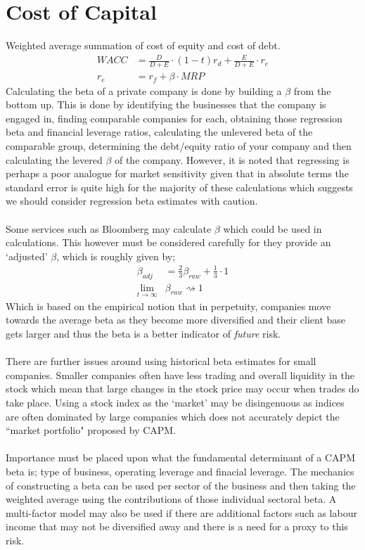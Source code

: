 \documentclass[a4paper]{article}
\begin{document}
\section{Cost of Capital}
Weighted average summation of cost of equity and cost of debt.
\begin{align*}
WACC &= \frac{D}{D+E} \cdot (1-t)r_d + \frac{E}{D + E} \cdot r_e \\
r_e &= r_f + \beta \cdot MRP
\end{align*}
Calculating the beta of a private company is done by building a $\beta$ from the
bottom up. This is done by identifying the businesses that the company is
engaged in, finding comparable companies for each, obtaining those regression
beta and financial leverage ratios, calculating the unlevered beta of the
comparable group, determining the debt/equity ratio of your company and then
calculating the levered $\beta$ of the company. However, it is noted that
regressing is perhaps a poor analogue for market sensitivity given that in
absolute terms the standard error is quite high for the majority of these
calculations which suggests we should consider regression beta estimates with
caution.\\\\
%
%
Some services such as Bloomberg may calculate $\beta$ which could be used in
calculations. This however must be considered carefully for they provide
an `adjusted' $\beta$, which is roughly given by;
\begin{align*}
\beta_{adj} &= \frac{2}{3} \beta_{raw} + \frac{1}{3} \cdot 1\\
\lim_{t\to\infty} &\beta_{raw}\rightsquigarrow 1
\end{align*}
Which is based on the empirical notion that in perpetuity, companies move towards the
average beta as they become more diversified and their client base gets larger
and thus the beta is a better indicator of \emph{future} risk. \\\\
%
%
There are further issues around using historical beta estimates for small
companies. Smaller companies often have less trading and overall liquidity in
the stock which mean that large changes in the stock price may occur when
trades do take place. Using a stock index as the `market' may be disingenuous
as indices are often dominated by large companies which does not accurately
depict the ``market portfolio" proposed by CAPM.\\\\
%
%
Importance must be placed upon what the fundamental determinant of a CAPM beta
is; type of business, operating leverage and finacial leverage. The
mechanics of constructing a beta can be used per sector of the business and then
taking the weighted average using the contributions of those individual sectoral
beta. A multi-factor model may also be used if there are additional factors
such as labour income that may not be diversified away and there is a need for
a proxy to this risk.
\end{document}
